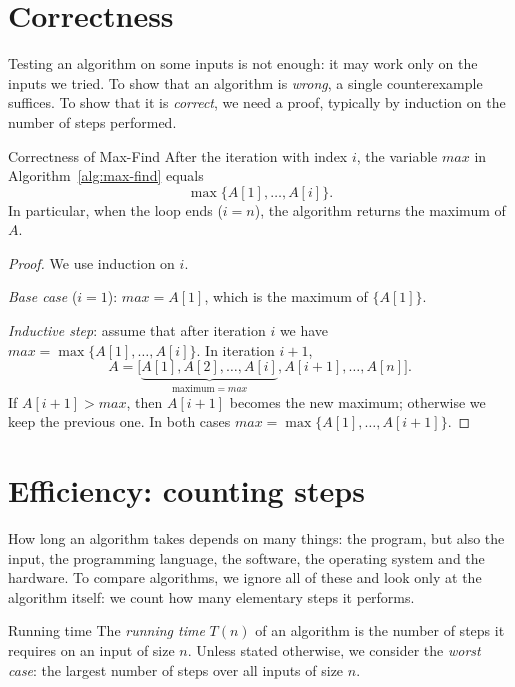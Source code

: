 \documentclass[a4paper,12pt,oneside]{report}
\begin{document}
\section{Correctness}

Testing an algorithm on some inputs is not enough: it may work only on
the inputs we tried. To show that an algorithm is \emph{wrong}, a single
counterexample suffices. To show that it is \emph{correct}, we need a
proof, typically by induction on the number of steps performed.

\begin{framedprop}{Correctness of Max-Find}\label{prop:max-find-correct}
After the iteration with index $i$, the variable $\mathit{max}$ in
Algorithm~\ref{alg:max-find} equals
\[
  \max\{A[1],\ldots,A[i]\}.
\]
In particular, when the loop ends ($i=n$), the algorithm returns the
maximum of $A$.
\end{framedprop}

\begin{proof}
We use induction on $i$.

\emph{Base case} ($i=1$): $\mathit{max}=A[1]$, which is the maximum of
$\{A[1]\}$.

\emph{Inductive step}: assume that after iteration $i$ we have
$\mathit{max}=\max\{A[1],\ldots,A[i]\}$. In iteration $i+1$,
\[
  A=\bigl[\underbrace{A[1],A[2],\ldots,A[i]}_{\text{maximum}=\mathit{max}},
     A[i+1],\ldots,A[n]\bigr].
\]
If $A[i+1]>\mathit{max}$, then $A[i+1]$ becomes the new maximum;
otherwise we keep the previous one. In both cases
$\mathit{max}=\max\{A[1],\ldots,A[i+1]\}$.
\end{proof}

\section{Efficiency: counting steps}

How long an algorithm takes depends on many things: the program, but
also the input, the programming language, the software, the operating
system and the hardware. To compare algorithms, we ignore all of these
and look only at the algorithm itself: we count how many elementary
steps it performs.

\begin{frameddefn}{Running time}\label{def:running-time}
The \emph{running time} $T(n)$ of an algorithm is the number of steps
it requires on an input of size $n$. Unless stated otherwise, we
consider the \emph{worst case}: the largest number of steps over all
inputs of size $n$.
\end{frameddefn}
\end{document}

